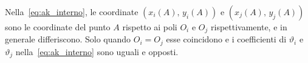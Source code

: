 \begin{oss}
	Nella~\eqref{eq:ak_interno},
	le coordinate $(x_i(A),\,y_i(A))$ e $(x_j(A),\,y_j(A))$
	sono le coordinate del punto $A$ rispetto ai poli $O_i$ e
	$O_j$ rispettivamente, e in generale differiscono. Solo
	quando $O_i = O_j$ esse coincidono e i coefficienti di
	$\vartheta_i$ e $\vartheta_j$ nella~\eqref{eq:ak_interno}
	sono uguali e opposti.
\end{oss}
%
%






